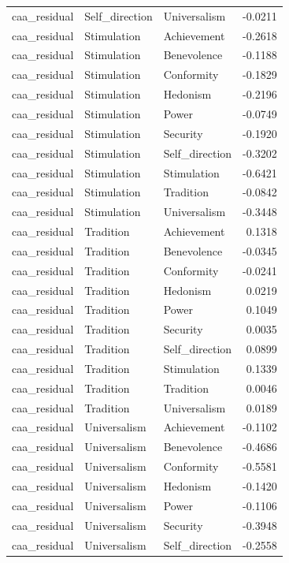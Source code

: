\begin{tabular}{lllr}
caa\_residual & Self\_direction & Universalism & -0.0211 \\
caa\_residual & Stimulation & Achievement & -0.2618 \\
caa\_residual & Stimulation & Benevolence & -0.1188 \\
caa\_residual & Stimulation & Conformity & -0.1829 \\
caa\_residual & Stimulation & Hedonism & -0.2196 \\
caa\_residual & Stimulation & Power & -0.0749 \\
caa\_residual & Stimulation & Security & -0.1920 \\
caa\_residual & Stimulation & Self\_direction & -0.3202 \\
caa\_residual & Stimulation & Stimulation & -0.6421 \\
caa\_residual & Stimulation & Tradition & -0.0842 \\
caa\_residual & Stimulation & Universalism & -0.3448 \\
caa\_residual & Tradition & Achievement & 0.1318 \\
caa\_residual & Tradition & Benevolence & -0.0345 \\
caa\_residual & Tradition & Conformity & -0.0241 \\
caa\_residual & Tradition & Hedonism & 0.0219 \\
caa\_residual & Tradition & Power & 0.1049 \\
caa\_residual & Tradition & Security & 0.0035 \\
caa\_residual & Tradition & Self\_direction & 0.0899 \\
caa\_residual & Tradition & Stimulation & 0.1339 \\
caa\_residual & Tradition & Tradition & 0.0046 \\
caa\_residual & Tradition & Universalism & 0.0189 \\
caa\_residual & Universalism & Achievement & -0.1102 \\
caa\_residual & Universalism & Benevolence & -0.4686 \\
caa\_residual & Universalism & Conformity & -0.5581 \\
caa\_residual & Universalism & Hedonism & -0.1420 \\
caa\_residual & Universalism & Power & -0.1106 \\
caa\_residual & Universalism & Security & -0.3948 \\
caa\_residual & Universalism & Self\_direction & -0.2558 \\

\end{tabular}
